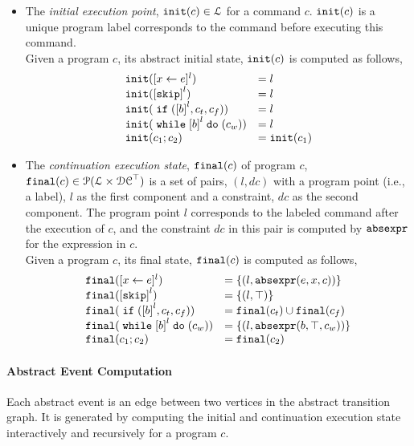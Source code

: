 %
\begin{itemize}
  \item The \emph{initial execution point}, $\mathtt{init}(c) \in \mathcal{L}$
  for a command $c$.
  $\mathtt{init}(c)$ is a unique program label corresponds to the command before executing this command. 
\\
Given a program $c$, its abstract initial state, $\mathtt{init}(c)$ is computed as follows,
%
\[
  \begin{array}{ll}
    \absinit(\clabel{\assign{x}{\expr}}{}^l)  & = l  \\
    \absinit(\clabel{\eskip}^{l})  & = l \\
    \absinit(\eif (\clabel{\bexpr}^l, c_t, c_f))  & = l \\
    \absinit(\ewhile \clabel{\bexpr}^l \edo (c_w))  & = l \\
    \absinit(c_1 ; c_2)  & = \absinit(c_1) \\
 \end{array}
 \]
%
%
\item The \emph{continuation execution state}, $\mathtt{final}(c)$ of program $c$, 
$\mathtt{final}(c) \in \mathcal{P}(\mathcal{L} \times \mathcal{DC}^{\top})$
is a set of pairs, $(l, dc)$ with a
program point (i.e., a label), $l$ as the first component and a constraint, 
$dc$ as the second component.
The program point $l$ corresponds to the labeled command after the execution of $c$,
and the constraint $dc$ in this pair is computed by $\mathtt{abs}{\mathtt{expr}}$ for the expression in $c$.
\\
Given a program $c$, its final state, $\mathtt{final}(c)$ is computed as follows,
 \[
  \begin{array}{ll}
    \absfinal(\clabel{\assign{x}{\expr}}{}^l)  & = \{(l, \absexpr(\expr, x, c))\}  \\
     \absfinal(\clabel{\eskip}^{l})  
     & = \{(l, \top)\} \\
     \absfinal(\eif (\clabel{\bexpr}^l, c_t, c_f))  & = \absfinal(c_t) \cup \absfinal(c_f) \\
     \absfinal(\ewhile \clabel{\bexpr}^l \edo (c_w))  & = \{(l, \absexpr(\bexpr, \top, c_w))\} \\
     \absfinal(c_1 ; c_2)  & =  \absfinal(c_2) \\
 \end{array}
 \]
\end{itemize}
 \paragraph{Abstract Event Computation} Each abstract event is an edge between two vertices in the abstract transition graph.
 It is generated by computing the initial and continuation execution state interactively and recursively for a program $c$.
 
